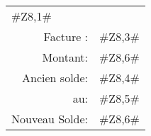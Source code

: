        \hspace{4cm} \begin{flushright}     
       \begin{tabular}{rp{2.5cm}}
       \multicolumn{2}{l}{#Z8,1#}  \\
       Facture :& #Z8,3# \\
       Montant:& #Z8,6#  \\
       Ancien solde:& #Z8,4# \\
       au: & #Z8,5#  	  \\  
       Nouveau Solde:& #Z8,6# \\ 	   
       \end{tabular}   
       \end{flushright}     

